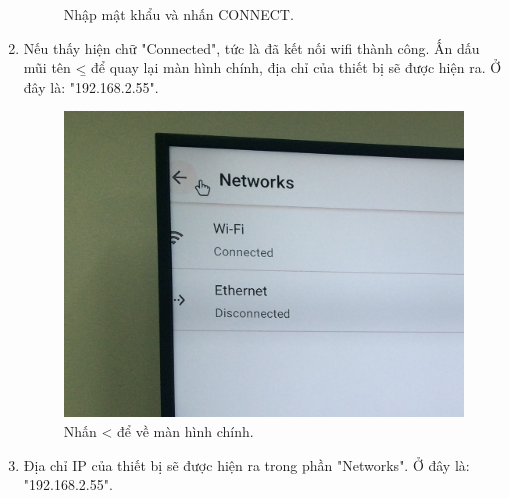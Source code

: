\begin{enumerate}
\begin{center}
\begin{figure}[htp]
\begin{center}
\end{center}
\caption{Nhập mật khẩu và nhấn CONNECT.}
\label{refhinh1}
\end{figure}
\end{center}
\item Nếu thấy hiện chữ "Connected", tức là đã kết nối wifi thành công. Ấn dấu mũi tên \b{<} để quay lại màn hình chính, địa chỉ của thiết bị sẽ được hiện ra. Ở đây là: "192.168.2.55".
\begin{center}
\begin{figure}[htp]
\begin{center}
\includegraphics[scale=0.15]{image3/buoc3s8.JPG}
\end{center}
\caption{Nhấn < để về màn hình chính.}
\label{refhinh1}
\end{figure}
\end{center}
\newpage
\item Địa chỉ IP của thiết bị sẽ được hiện ra trong phần "Networks". Ở đây là: "192.168.2.55".
\begin{center}
\begin{figure}[htp]
\begin{center}

\end{center}
\end{figure}
\end{center}
\end{enumerate}
